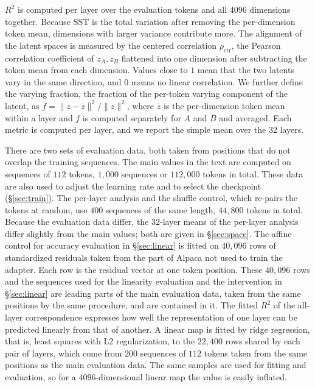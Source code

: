 \documentclass[conference]{IEEEtran}
\newcommand{\Rsq}{R^2}
\begin{document}
$\Rsq$ is computed per layer over the evaluation tokens and all $4096$ dimensions together. Because $\mathrm{SST}$ is the total
variation after removing the per-dimension token mean, dimensions with larger variance contribute more. The alignment of the latent
spaces is measured by the centered correlation $\rho_{\mathrm{ctr}}$, the Pearson correlation coefficient of $z_A,z_B$ flattened into
one dimension after subtracting the token mean from each dimension. Values close to $1$ mean that the two latents vary in the same
direction, and $0$ means no linear correlation. We further define the varying fraction, the fraction of the per-token varying component of the latent, as $f=\lVert z-\overline z\rVert^2/\lVert z\rVert^2$, where
$\overline z$ is the per-dimension token mean within a layer and $f$ is computed separately for $A$ and $B$ and averaged. Each metric
is computed per layer, and we report the simple mean over the $32$ layers.

There are two sets of evaluation data, both taken from positions that do not overlap the training sequences. The main values in the
text are computed on sequences of $112$ tokens, $1{,}000$ sequences or $112{,}000$ tokens in total.
These data are also used to adjust the learning rate and to select the checkpoint (\S\ref{sec:train}). The per-layer analysis and the
shuffle control, which re-pairs the tokens at random, use $400$ sequences of the same length, $44{,}800$ tokens in total.
Because the evaluation data differ, the $32$-layer means of the per-layer analysis differ slightly from the main values; both are
given in \S\ref{sec:space}.
The affine control for accuracy evaluation in \S\ref{sec:linear} is fitted on $40{,}096$ rows of standardized residuals taken from the
part of Alpaca not used to train the adapter. Each row is the residual vector at one token position. These $40{,}096$ rows and the sequences used for the linearity evaluation and the
intervention in \S\ref{sec:linear} are leading parts of the main evaluation data, taken from the same positions by the same procedure, and are contained in it.
The fitted $R^2$ of the all-layer correspondence expresses how well the representation of one layer can be predicted linearly from
that of another. A linear map is fitted by ridge regression, that is, least squares with L2 regularization, to the $22{,}400$ rows shared by each
pair of layers, which come from $200$ sequences of $112$ tokens taken from the same positions as the main evaluation data. The same
samples are used for fitting and evaluation, so for a $4096$-dimensional linear map the value is easily inflated.
\end{document}
